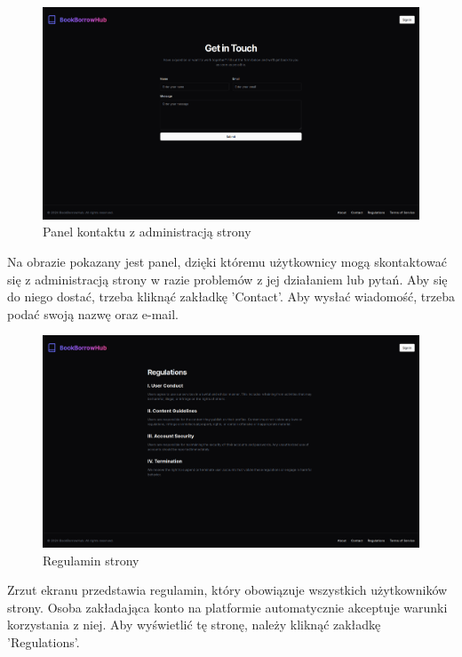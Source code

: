 \documentclass[12pt]{article}
\begin{document}
\newpage
\begin{figure}[h!]
	\centering
	\includegraphics[width=17.5cm]{figures/Obraz7.png}
	\caption{Panel kontaktu z administracją strony}
\end{figure}
Na obrazie pokazany jest panel, 
dzięki któremu użytkownicy mogą skontaktować 
się z administracją strony w razie problemów z 
jej działaniem lub pytań. Aby się do niego dostać, 
trzeba kliknąć zakładkę 'Contact'. 
Aby wysłać wiadomość, trzeba podać swoją nazwę oraz e-mail.

\newpage
\begin{figure}[h!]
	\centering
	\includegraphics[width=17.5cm]{figures/Obraz8.png}
	\caption{Regulamin strony}
\end{figure}
Zrzut ekranu przedstawia regulamin, 
który obowiązuje wszystkich użytkowników strony. 
Osoba zakładająca konto na platformie automatycznie 
akceptuje warunki korzystania z niej. 
Aby wyświetlić tę stronę, należy kliknąć zakładkę 'Regulations'.
\end{document}
